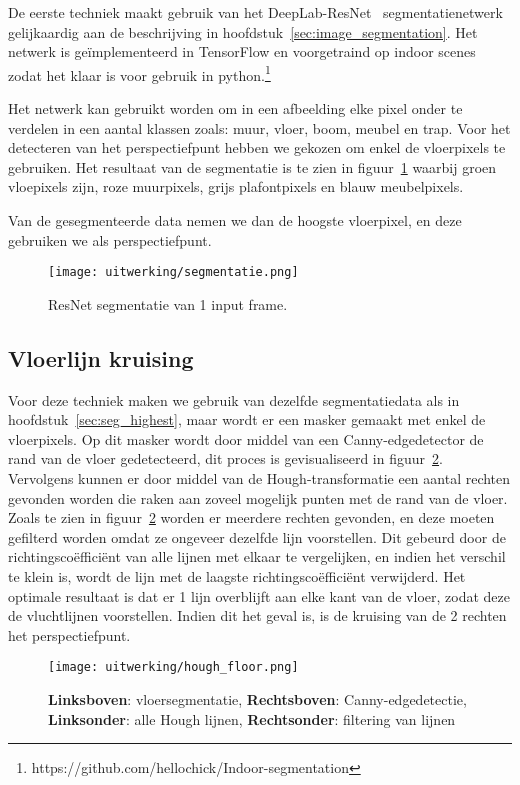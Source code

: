 De eerste techniek maakt gebruik van het DeepLab-ResNet~\cite{resnet101} segmentatienetwerk gelijkaardig aan de beschrijving in hoofdstuk~\ref{sec:image_segmentation}.
Het netwerk is ge\"{i}mplementeerd in TensorFlow en voorgetraind op indoor scenes zodat het klaar is voor gebruik in python.\footnote{https://github.com/hellochick/Indoor-segmentation}

Het netwerk kan gebruikt worden om in een afbeelding elke pixel onder te verdelen in een aantal klassen zoals: muur, vloer, boom, meubel en trap.
Voor het detecteren van het perspectiefpunt hebben we gekozen om enkel de vloerpixels te gebruiken.
Het resultaat van de segmentatie is te zien in figuur~\ref{fig:floor_seg} waarbij groen vloepixels zijn, roze muurpixels, grijs plafontpixels en blauw meubelpixels.

Van de gesegmenteerde data nemen we dan de hoogste vloerpixel, en deze gebruiken we als perspectiefpunt.
\begin{figure}
    \centering
    \texttt{[image: uitwerking/segmentatie.png]}
    \caption{ResNet segmentatie van 1 input frame.}
    \label{fig:floor_seg}
\end{figure}


\subsection{Vloerlijn kruising}\label{sec:hough_floor}
Voor deze techniek maken we gebruik van dezelfde segmentatiedata als in hoofdstuk~\ref{sec:seg_highest}, maar wordt er een masker gemaakt met enkel de vloerpixels.
Op dit masker wordt door middel van een Canny-edgedetector de rand van de vloer gedetecteerd, dit proces is gevisualiseerd in figuur~\ref{fig:hough_floor}.
Vervolgens kunnen er door middel van de Hough-transformatie een aantal rechten gevonden worden die raken aan zoveel mogelijk punten met de rand van de vloer.
Zoals te zien in figuur~\ref{fig:hough_floor} worden er meerdere rechten gevonden, en deze moeten gefilterd worden omdat ze ongeveer dezelfde lijn voorstellen.
Dit gebeurd door de richtingsco\"{e}ffici\"{e}nt van alle lijnen met elkaar te vergelijken, en indien het verschil te klein is, wordt de lijn met de laagste
richtingsco\"{e}ffici\"{e}nt verwijderd.
Het optimale resultaat is dat er 1 lijn overblijft aan elke kant van de vloer, zodat deze de vluchtlijnen voorstellen.
Indien dit het geval is, is de kruising van de 2 rechten het perspectiefpunt.

\begin{figure}
    \texttt{[image: uitwerking/hough\_floor.png]}
    \caption{\textbf{Linksboven}: vloersegmentatie, \textbf{Rechtsboven}: Canny-edgedetectie, \textbf{Linksonder}: alle Hough lijnen, \textbf{Rechtsonder}: filtering van lijnen}
    \label{fig:hough_floor}
\end{figure}



